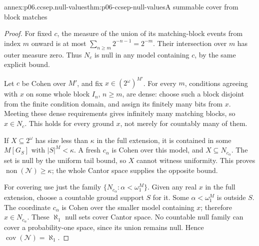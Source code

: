 \begin{annexitem}{annex:p06.ccsep.null-values}{thm:p06-ccsep-null-values}{A summable cover from block matches}
\begin{proof}
For fixed \(c\), the measure of the union of its matching-block
events from index \(m\) onward is at most
\(\sum_{n\geq m}2^{-n-1}=2^{-m}\). Their intersection over
\(m\) has outer measure zero. Thus \(N_c\) is null in any
model containing \(c\), by the same explicit bound.

Let \(c\) be Cohen over \(M'\), and fix \(x\in(2^\omega)^{M'}\).
For every \(m\), conditions agreeing with \(x\) on some whole
block \(I_n\), \(n\geq m\), are dense: choose such a block
disjoint from the finite condition domain, and assign its finitely
many bits from \(x\). Meeting these dense requirements gives
infinitely many matching blocks, so \(x\in N_c\). This holds
for every ground \(x\), not merely for countably many of them.

If \(X\subseteq2^\omega\) has size less than \(\kappa\) in the
full extension, it is contained in some \(M[G_S]\) with
\(|S|^M<\kappa\). A fresh \(c_\alpha\) is Cohen over this
model, and \(X\subseteq N_{c_\alpha}\). The set is null by
the uniform tail bound, so \(X\) cannot witness uniformity.
This proves \(\operatorname{non}(\mathcal N)\geq\kappa\);
the whole Cantor space supplies the opposite bound.

For covering use just the family
\(\{N_{c_\alpha}:\alpha<\omega_1^M\}\). Given any real \(x\)
in the full extension, choose a countable ground support \(S\)
for it. Some \(\alpha<\omega_1^M\) is outside \(S\). The
coordinate \(c_\alpha\) is Cohen over the smaller model
containing \(x\); therefore \(x\in N_{c_\alpha}\). These
\(\aleph_1\) null sets cover Cantor space. No countable null
family can cover a probability-one space, since its union remains
null. Hence \(\operatorname{cov}(\mathcal N)=\aleph_1\).
\end{proof}
\end{annexitem}

